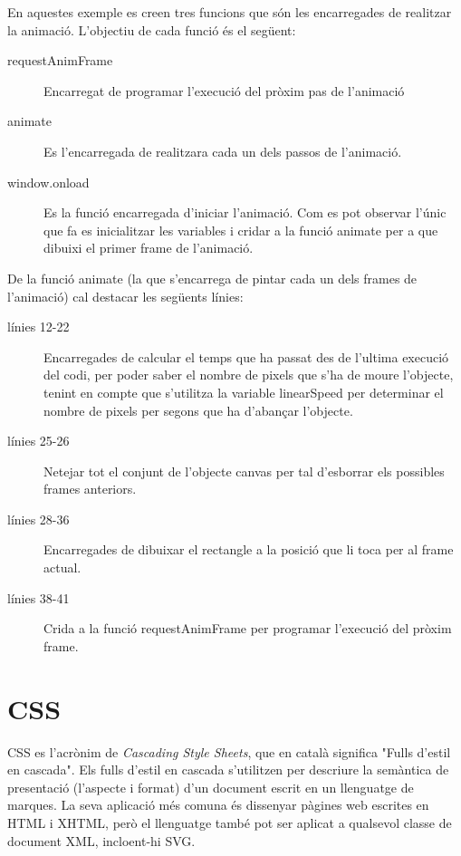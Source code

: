 En aquestes exemple es creen tres funcions que són les encarregades de realitzar la animació. L'objectiu de cada funció és el següent:

\begin{description}
    \item[requestAnimFrame]{ Encarregat de programar l'execució del pròxim pas de l'animació}
    \item[animate]{ Es l'encarregada de realitzara cada un dels passos de l'animació.}
    \item[window.onload] { Es la funció encarregada d'iniciar l'animació. Com es pot observar l'únic que fa es inicialitzar les variables i cridar a la funció animate per a que dibuixi el primer frame de l'animació.}
\end{description}

De la funció animate (la que s'encarrega de pintar cada un dels frames de l'animació) cal destacar les següents línies:

\begin{description}
    \item[línies 12-22] {Encarregades de calcular el temps que ha passat des de l'ultima execució del codi, per poder saber el nombre de pixels que s'ha de moure l'objecte, tenint en compte que s'utilitza la variable linearSpeed per determinar el nombre de pixels per segons que ha d'abançar l'objecte.}
    \item[línies 25-26] {Netejar tot el conjunt de l'objecte canvas per tal d'esborrar els possibles frames anteriors.}
    \item[línies 28-36] {Encarregades de dibuixar el rectangle a la posició que li toca per al frame actual.}
    \item[línies 38-41] {Crida a la funció requestAnimFrame per programar l'execució del pròxim frame.}
\end{description} 


\section{CSS}

CSS es l'acrònim de \emph{Cascading Style Sheets}, que en català significa "Fulls d'estil en cascada". Els fulls d'estil en cascada s'utilitzen per descriure la semàntica de presentació (l'aspecte i format) d'un document escrit en un llenguatge de marques. La seva aplicació més comuna és dissenyar pàgines web escrites en HTML i XHTML, però el llenguatge també pot ser aplicat a qualsevol classe de document XML, incloent-hi SVG.

